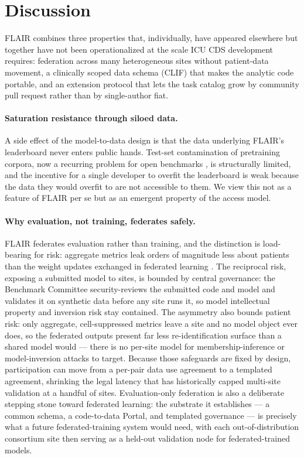 \section{Discussion}

FLAIR combines three properties that, individually, have appeared
elsewhere but together have not been operationalized at the scale ICU
CDS development requires: federation across many heterogeneous sites
without patient-data movement, a clinically scoped data schema (CLIF)
that makes the analytic code portable, and an extension protocol that
lets the task catalog grow by community pull request rather than by
single-author fiat.

\paragraph{Saturation resistance through siloed data.} A side effect of
the model-to-data design is that the data underlying FLAIR's leaderboard
never enters public hands. Test-set contamination of pretraining
corpora, now a recurring problem for open benchmarks
\citep{recht2019imagenet,chekroud2024illusory}, is structurally
limited, and the incentive for a single developer to overfit the
leaderboard is weak because the data they would overfit to are not
accessible to them. We view this not as a feature of FLAIR per se but
as an emergent property of the access model.

\paragraph{Why evaluation, not training, federates safely.} FLAIR
federates evaluation rather than training, and the distinction is
load-bearing for risk: aggregate metrics leak orders of magnitude less
about patients than the weight updates exchanged in federated learning
\citep{karargyris2023medperf}. The reciprocal risk, exposing a submitted
model to sites, is bounded by central governance: the Benchmark Committee
security-reviews the submitted code and model and validates it on synthetic
data before any site runs it, so model intellectual property and inversion
risk stay contained. The asymmetry also bounds patient risk: only
aggregate, cell-suppressed metrics leave a site and no model object ever
does, so the federated outputs present far less re-identification surface
than a shared model would --- there is no per-site model for
membership-inference or model-inversion attacks to target. Because those
safeguards are fixed by design, participation can move from a per-pair data
use agreement to a templated agreement, shrinking the legal latency that has
historically capped multi-site validation at a handful of sites.
Evaluation-only federation is also a deliberate stepping stone toward
federated learning: the substrate it establishes --- a common schema, a
code-to-data Portal, and templated governance --- is precisely what a
future federated-training system would need, with each out-of-distribution
consortium site then serving as a held-out validation node for
federated-trained models.

